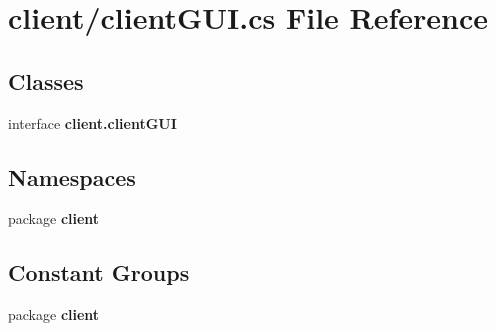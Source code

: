 \section{client/client\-G\-U\-I.cs File Reference}
\label{client_g_u_i_8cs}
\subsection*{Classes}
\begin{DoxyCompactItemize}
\item 
interface {\bf client.\-client\-G\-U\-I}
\end{DoxyCompactItemize}
\subsection*{Namespaces}
\begin{DoxyCompactItemize}
\item 
package {\bf client}
\end{DoxyCompactItemize}
\subsection*{Constant Groups}
\begin{DoxyCompactItemize}
\item 
package {\bf client}
\end{DoxyCompactItemize}
